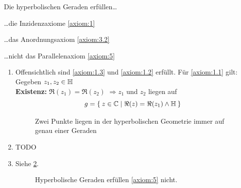 \begin{bemerkung}
    Die hyperbolischen Geraden erfüllen\dots
    \begin{bemenum}
        \item \dots die Inzidenzaxiome \ref{axiom:1}
        \item \dots das Anordnungsaxiom \ref{axiom:3.2}
        \item \dots nicht das Parallelenaxiom \ref{axiom:5}
    \end{bemenum}
\end{bemerkung}

\begin{beweis}\leavevmode
    \begin{enumerate}[label=\alph*), ref=\theproposition (\alph*)]
        \item Offensichtlich sind \ref{axiom:1.3} und \ref{axiom:1.2}
              erfüllt. Für \ref{axiom:1.1} gilt:\\
              Gegeben $z_1, z_2 \in \mathbb{H}$\\
              \textbf{Existenz:} $\Re(z_1) = \Re(z_2)$
              $\Rightarrow z_1$ und $z_2$ liegen auf
              \[g = \Set{z \in \ensuremath{\mathbb{C}}| \Re(z) = \Re(z_1) \land \ensuremath{\mathbb{H}}}\]

            \begin{figure}[ht]
                \centering
                \subfloat[Fall 1]{
                    \resizebox{0.45\linewidth}{!}{}
                    \label{fig:hyperbolische-geometrie-axiom-1-1}
                }%
                \subfloat[Fall 2]{
                    \resizebox{0.45\linewidth}{!}{}
                    \label{fig:hyperbolische-geometrie-axiom-1-2}
                }%
                \label{fig:hyperbolische-geometrie-axiom-1-0}
                \caption{Zwei Punkte liegen in der hyperbolischen Geometrie immer auf genau einer Geraden}
            \end{figure}
        \item TODO
        \item Siehe \cref{fig:hyperbolische-halbebene-axiom-5}.
            \begin{figure}[htp]
                \centering
                
                \caption{Hyperbolische Geraden erfüllen \ref{axiom:5} nicht.}
                \label{fig:hyperbolische-halbebene-axiom-5}
            \end{figure}
    \end{enumerate}
\end{beweis}

